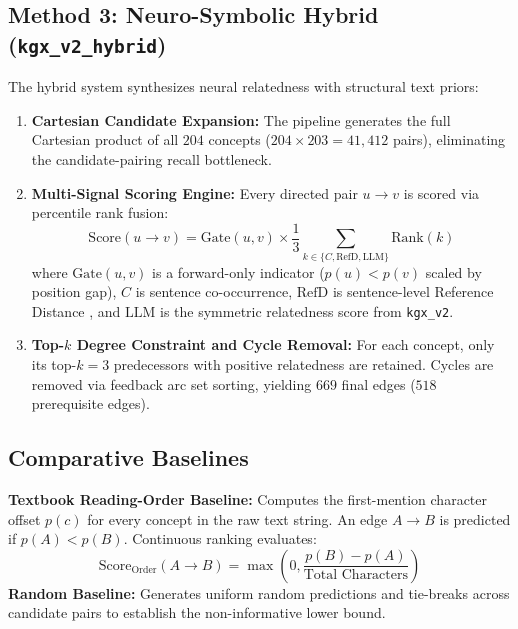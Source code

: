 \subsection{Method 3: Neuro-Symbolic Hybrid (\texttt{kgx\_v2\_hybrid})}
The hybrid system synthesizes neural relatedness with structural text priors:
\begin{enumerate}[leftmargin=*]
    \item \textbf{Cartesian Candidate Expansion:} The pipeline generates the full Cartesian product of all $204$ concepts ($204 \times 203 = 41{,}412$ pairs), eliminating the candidate-pairing recall bottleneck.
    \item \textbf{Multi-Signal Scoring Engine:} Every directed pair $u \to v$ is scored via percentile rank fusion:
    \begin{equation}
    \text{Score}(u \to v) = \text{Gate}(u, v) \times \frac{1}{3} \sum_{k \in \{C, \text{RefD}, \text{LLM}\}} \text{Rank}(k)
    \end{equation}
    where $\text{Gate}(u, v)$ is a forward-only indicator ($p(u) < p(v)$ scaled by position gap), $C$ is sentence co-occurrence, $\text{RefD}$ is sentence-level Reference Distance \cite{liang2015prereq}, and $\text{LLM}$ is the symmetric relatedness score from \texttt{kgx\_v2}.
    \item \textbf{Top-$k$ Degree Constraint and Cycle Removal:} For each concept, only its top-$k=3$ predecessors with positive relatedness are retained. Cycles are removed via feedback arc set sorting, yielding $669$ final edges ($518$ prerequisite edges).
\end{enumerate}

\subsection{Comparative Baselines}
\textbf{Textbook Reading-Order Baseline:} Computes the first-mention character offset $p(c)$ for every concept in the raw text string. An edge $A \to B$ is predicted if $p(A) < p(B)$. Continuous ranking evaluates:
\begin{equation}
\text{Score}_{\text{Order}}(A \to B) = \max\left(0, \frac{p(B) - p(A)}{\text{Total Characters}}\right)
\end{equation}
\textbf{Random Baseline:} Generates uniform random predictions and tie-breaks across candidate pairs to establish the non-informative lower bound.
